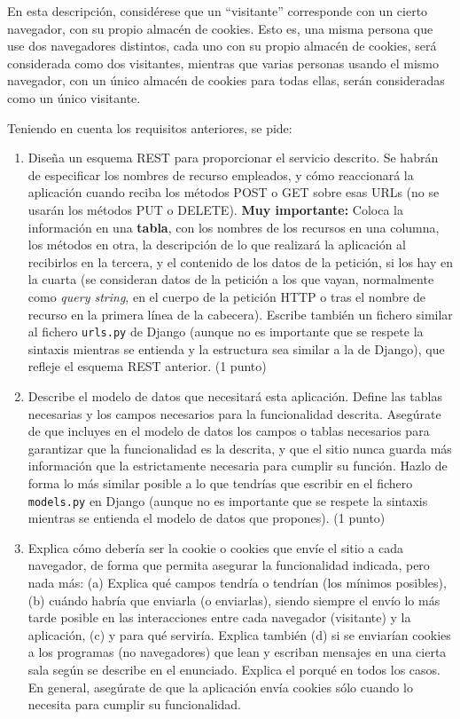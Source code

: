En esta descripción, considérese que un ``visitante'' corresponde con un cierto navegador, con su propio almacén de cookies. Esto es, una misma persona que use dos navegadores distintos, cada uno con su propio almacén de cookies, será considerada como dos visitantes, mientras que varias personas usando el mismo navegador, con un único almacén de cookies para todas ellas, serán consideradas como un único visitante.

\newpage

Teniendo en cuenta los requisitos anteriores, se pide:

\begin{enumerate}
\item Diseña un esquema REST para proporcionar el servicio descrito. Se habrán de especificar los nombres de recurso empleados, y cómo reaccionará la aplicación cuando reciba los métodos POST o GET sobre esas URLs (no se usarán los métodos PUT o DELETE). \textbf{Muy importante:} Coloca la información en una \textbf{tabla}, con los nombres de los recursos en una columna, los métodos en otra, la descripción de lo que realizará la aplicación al recibirlos en la tercera, y el contenido de los datos de la petición, si los hay en la cuarta (se consideran datos de la petición a los que vayan, normalmente como \emph{query string}, en el cuerpo de la petición HTTP o tras el nombre de recurso en la primera línea de la cabecera). Escribe también un fichero similar al fichero \texttt{urls.py} de Django (aunque no es importante que se respete la sintaxis mientras se entienda y la estructura sea similar a la de Django), que refleje el esquema REST anterior. (1 punto)

\item Describe el modelo de datos que necesitará esta aplicación. Define las tablas necesarias y los campos necesarios para la funcionalidad descrita. Asegúrate de que incluyes en el modelo de datos los campos o tablas necesarios para garantizar que la funcionalidad es la descrita, y que el sitio nunca guarda más información que la estrictamente necesaria para cumplir su función. Hazlo de forma lo más similar posible a lo que tendrías que escribir en el fichero \texttt{models.py} en Django (aunque no es importante que se respete la sintaxis mientras se entienda el modelo de datos que propones). (1 punto)

\item Explica cómo debería ser la cookie o cookies que envíe el sitio a cada navegador, de forma que permita asegurar la funcionalidad indicada, pero nada más: (a) Explica qué campos tendría o tendrían (los mínimos posibles), (b) cuándo habría que enviarla (o enviarlas), siendo siempre el envío lo más tarde posible en las interacciones entre cada navegador (visitante) y la aplicación, (c) y para qué serviría. Explica también (d) si se enviarían cookies a los programas (no navegadores) que lean y escriban mensajes en una cierta sala según se describe en el enunciado. Explica el porqué en todos los casos. En general, asegúrate de que la aplicación envía cookies sólo cuando lo necesita para cumplir su funcionalidad.
  

\end{enumerate}
